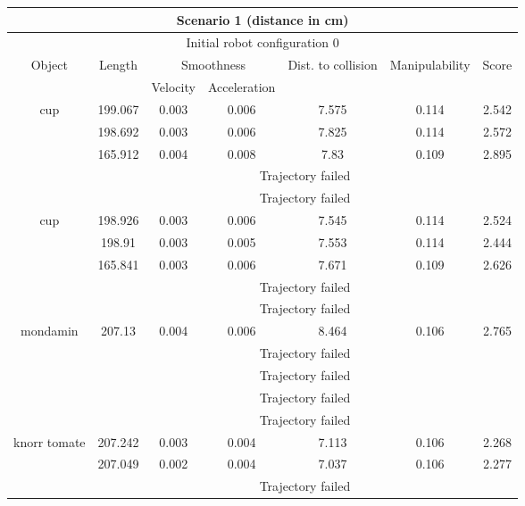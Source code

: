 {\small
\begin{center}
\begin{longtable}[c]{ | c | c | c | c | c | c || c || }
\hline
\hline
\multicolumn{7}{|c|}{Scenario 1 (distance in cm)} \\
\hline
\hline
\multicolumn{7}{|c|}{Initial robot configuration 0} \\
\hline
\multirow{2}{*}{Object} & \multirow{2}{*}{Length} & \multicolumn{2}{c|}{Smoothness} & \multirow{2}{1.7cm}{Dist. to collision} &\multirow{2}{*}{Manipulability} & \multirow{2}{*}{Score}\\
& & Velocity & Acceleration & & & \\
\hline
\multirow{5}{1.7cm}{cup}& 199.067 & 0.003 & 0.006 & 7.575 & 0.114 & 2.542 \\ 
& 198.692 & 0.003 & 0.006 & 7.825 & 0.114 & 2.572 \\ 
& 165.912 & 0.004 & 0.008 & 7.83 & 0.109 & 2.895 \\ 
& \multicolumn{6}{c|}{Trajectory failed} \\ 
& \multicolumn{6}{c|}{Trajectory failed} \\ 
\hline
\multirow{5}{1.7cm}{cup}& 198.926 & 0.003 & 0.006 & 7.545 & 0.114 & 2.524 \\ 
& 198.91 & 0.003 & 0.005 & 7.553 & 0.114 & 2.444 \\ 
& 165.841 & 0.003 & 0.006 & 7.671 & 0.109 & 2.626  \\ 
& \multicolumn{6}{c|}{Trajectory failed} \\ 
& \multicolumn{6}{c|}{Trajectory failed} \\ 
\hline\multirow{5}{1.7cm}{mondamin}& 207.13 & 0.004 & 0.006 & 8.464 & 0.106 & 2.765 \\ 
& \multicolumn{6}{c|}{Trajectory failed} \\ 
& \multicolumn{6}{c|}{Trajectory failed} \\ 
& \multicolumn{6}{c|}{Trajectory failed} \\ 
& \multicolumn{6}{c|}{Trajectory failed} \\ 
\hline\multirow{5}{1.7cm}{knorr tomate}& 207.242 & 0.003 & 0.004 & 7.113 & 0.106 & 2.268 \\ 
& 207.049 & 0.002 & 0.004 & 7.037 & 0.106 & 2.277 \\ 
& \multicolumn{6}{c|}{Trajectory failed} \\ 

\end{longtable}
\end{center}}
